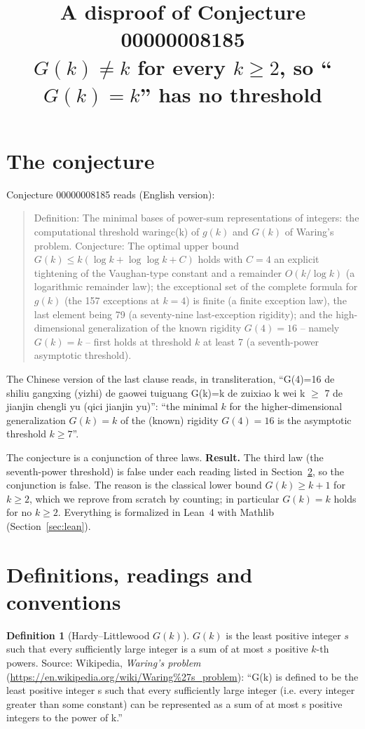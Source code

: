 \documentclass[11pt]{article}
\title{A disproof of Conjecture 00000008185\\[2pt]
\large $G(k) \ne k$ for every $k \ge 2$, so ``$G(k)=k$'' has no threshold}
\date{}
\renewcommand{\_}{\oldus\allowbreak}
\theoremstyle{definition}
\newtheorem{definition}[theorem]{Definition}
\begin{document}
\sloppy
\maketitle

\section{The conjecture}

Conjecture 00000008185 reads (English version):

\begin{quote}
Definition: The minimal bases of power-sum representations of integers: the computational threshold
waring\_c(k) of $g(k)$ and $G(k)$ of Waring's problem. Conjecture: The optimal upper bound $G(k) \le
k(\log k + \log\log k + C)$ holds with $C = 4$ an explicit tightening of the Vaughan-type constant and a
remainder $O(k/\log k)$ (a logarithmic remainder law); the exceptional set of the complete formula for
$g(k)$ (the 157 exceptions at $k = 4$) is finite (a finite exception law), the last element being 79 (a
seventy-nine last-exception rigidity); and the high-dimensional generalization of the known rigidity
$G(4) = 16$ -- namely $G(k) = k$ -- first holds at threshold $k$ at least 7 (a seventh-power asymptotic
threshold).
\end{quote}

The Chinese version of the last clause reads, in transliteration, ``G(4)=16 de shiliu gangxing
(yizhi) de gaowei tuiguang G(k)=k de zuixiao k wei k $\ge$ 7 de jianjin chengli yu (qici jianjin
yu)'': ``the minimal $k$ for the higher-dimensional generalization $G(k)=k$ of the (known) rigidity
$G(4)=16$ is the asymptotic threshold $k \ge 7$''.

The conjecture is a conjunction of three laws. \textbf{Result.} The third law (the seventh-power
threshold) is false under each reading listed in Section~\ref{sec:reading}, so the conjunction is false.
The reason is the classical lower bound $G(k) \ge k+1$ for $k \ge 2$, which we reprove from scratch by
counting; in particular $G(k) = k$ holds for no $k \ge 2$. Everything is formalized in Lean~4 with
Mathlib (Section~\ref{sec:lean}).

\section{Definitions, readings and conventions}\label{sec:reading}

\begin{definition}[Hardy--Littlewood $G(k)$]
$G(k)$ is the least positive integer $s$ such that every sufficiently large integer is a sum of at most
$s$ positive $k$-th powers. Source: Wikipedia, \emph{Waring's problem}
(\url{https://en.wikipedia.org/wiki/Waring%27s_problem}): ``G(k) is defined to be the least positive
integer s such that every sufficiently large integer (i.e. every integer greater than some constant) can
be represented as a sum of at most s positive integers to the power of k.''
\end{definition}
\end{document}
